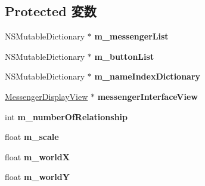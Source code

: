 \subsection*{Protected 変数}
\begin{DoxyCompactItemize}
\item 
\hypertarget{interface_messenger_view_controller_aa7a06978c9d2e2580a0cd3b19467c204}{
NSMutableDictionary $\ast$ {\bfseries m\_\-messengerList}}
\label{d7/d34/interface_messenger_view_controller_aa7a06978c9d2e2580a0cd3b19467c204}

\item 
\hypertarget{interface_messenger_view_controller_afb79d57e4d89d863e81dc6bf77e33d7d}{
NSMutableDictionary $\ast$ {\bfseries m\_\-buttonList}}
\label{d7/d34/interface_messenger_view_controller_afb79d57e4d89d863e81dc6bf77e33d7d}

\item 
\hypertarget{interface_messenger_view_controller_a70f8ee629bb1e1c67dc0e74389d29c29}{
NSMutableDictionary $\ast$ {\bfseries m\_\-nameIndexDictionary}}
\label{d7/d34/interface_messenger_view_controller_a70f8ee629bb1e1c67dc0e74389d29c29}

\item 
\hypertarget{interface_messenger_view_controller_a8cbd0807ee7f3d3a50ad46cfb6dfed21}{
\hyperlink{interface_messenger_display_view}{MessengerDisplayView} $\ast$ {\bfseries messengerInterfaceView}}
\label{d7/d34/interface_messenger_view_controller_a8cbd0807ee7f3d3a50ad46cfb6dfed21}

\item 
\hypertarget{interface_messenger_view_controller_af273157267a9808e9bb252e3a43f80c6}{
int {\bfseries m\_\-numberOfRelationship}}
\label{d7/d34/interface_messenger_view_controller_af273157267a9808e9bb252e3a43f80c6}

\item 
\hypertarget{interface_messenger_view_controller_a5e7ee1ec43301204e1ef57fb7a3e0153}{
float {\bfseries m\_\-scale}}
\label{d7/d34/interface_messenger_view_controller_a5e7ee1ec43301204e1ef57fb7a3e0153}

\item 
\hypertarget{interface_messenger_view_controller_abf360a74ed5bfcfcc0e2e5d9ca883e4f}{
float {\bfseries m\_\-worldX}}
\label{d7/d34/interface_messenger_view_controller_abf360a74ed5bfcfcc0e2e5d9ca883e4f}

\item 
\hypertarget{interface_messenger_view_controller_a99f4c4324081b5a093411151cb82bb96}{
float {\bfseries m\_\-worldY}}
\label{d7/d34/interface_messenger_view_controller_a99f4c4324081b5a093411151cb82bb96}

\end{DoxyCompactItemize}


